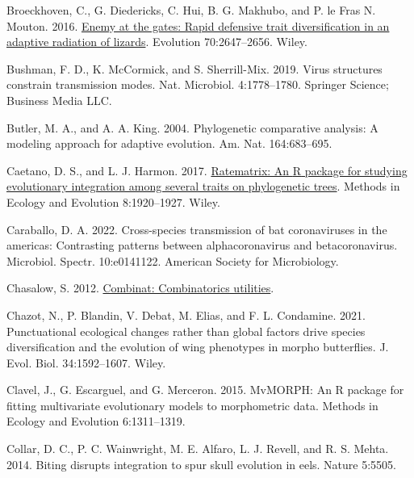 \documentclass[fleqn,10pt,lineno]{wlpeerj} %
\newlength{\cslhangindent}
\newlength{\cslentryspacingunit} %
\newenvironment{CSLReferences}[2] %
 {%
  \setlength{\parindent}{0pt}
  \ifodd #1
  \let\oldpar\par
  \def\par{\hangindent=\cslhangindent\oldpar}
  \fi
  \setlength{\parskip}{#2\cslentryspacingunit}
 }%
 {}
\begin{document}
\begin{CSLReferences}{1}{0}
\leavevmode{}%
Broeckhoven, C., G. Diedericks, C. Hui, B. G. Makhubo, and P. le Fras N. Mouton. 2016. \href{https://doi.org/10.1111/evo.13062}{Enemy at the gates: Rapid defensive trait diversification in an adaptive radiation of lizards}. Evolution 70:2647--2656. Wiley.

\leavevmode{}%
Bushman, F. D., K. McCormick, and S. Sherrill-Mix. 2019. Virus structures constrain transmission modes. Nat. Microbiol. 4:1778--1780. Springer Science; Business Media LLC.

\leavevmode{}%
Butler, M. A., and A. A. King. 2004. Phylogenetic comparative analysis: A modeling approach for adaptive evolution. Am. Nat. 164:683--695.

\leavevmode{}%
Caetano, D. S., and L. J. Harmon. 2017. \href{https://doi.org/10.1111/2041-210x.12826}{Ratematrix: An {R} package for studying evolutionary integration among several traits on phylogenetic trees}. Methods in Ecology and Evolution 8:1920--1927. Wiley.

\leavevmode{}%
Caraballo, D. A. 2022. Cross-species transmission of bat coronaviruses in the americas: Contrasting patterns between alphacoronavirus and betacoronavirus. Microbiol. Spectr. 10:e0141122. American Society for Microbiology.

\leavevmode{}%
Chasalow, S. 2012. \href{https://CRAN.R-project.org/package=combinat}{Combinat: Combinatorics utilities}.

\leavevmode{}%
Chazot, N., P. Blandin, V. Debat, M. Elias, and F. L. Condamine. 2021. Punctuational ecological changes rather than global factors drive species diversification and the evolution of wing phenotypes in morpho butterflies. J. Evol. Biol. 34:1592--1607. Wiley.

\leavevmode{}%
Clavel, J., G. Escarguel, and G. Merceron. 2015. Mv{MORPH}: An {R} package for fitting multivariate evolutionary models to morphometric data. Methods in Ecology and Evolution 6:1311--1319.

\leavevmode{}%
Collar, D. C., P. C. Wainwright, M. E. Alfaro, L. J. Revell, and R. S. Mehta. 2014. Biting disrupts integration to spur skull evolution in eels. Nature 5:5505.


\end{CSLReferences}
\end{document}
